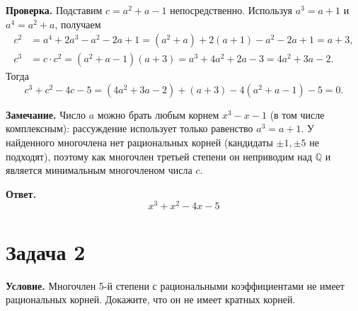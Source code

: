 \documentclass[12pt]{article}
\begin{document}
	\medskip
	\noindent
	\textbf{Проверка.} Подставим $c = a^2 + a - 1$ непосредственно. Используя $a^3 = a + 1$ и $a^4 = a^2 + a$, получаем
	\begin{align*}
		c^2 &= a^4 + 2a^3 - a^2 - 2a + 1 = (a^2 + a) + 2(a + 1) - a^2 - 2a + 1 = a + 3, \\
		c^3 &= c \cdot c^2 = (a^2 + a - 1)(a + 3) = a^3 + 4a^2 + 2a - 3 = 4a^2 + 3a - 2.
	\end{align*}
	Тогда
	\[
		c^3 + c^2 - 4c - 5 = (4a^2 + 3a - 2) + (a + 3) - 4(a^2 + a - 1) - 5 = 0.
	\]

	\medskip
	\noindent
	\textbf{Замечание.} Число $a$ можно брать любым корнем $x^3 - x - 1$ (в том числе комплексным): рассуждение использует только равенство $a^3 = a + 1$. У найденного многочлена нет рациональных корней (кандидаты $\pm 1, \pm 5$ не подходят), поэтому как многочлен третьей степени он неприводим над $\mathbb{Q}$ и является минимальным многочленом числа $c$.

	\medskip
	\noindent
	\textbf{Ответ.}
	\[
		\boxed{x^3 + x^2 - 4x - 5}
	\]

	\section*{Задача 2}

	\noindent
	\textbf{Условие.} Многочлен 5-й степени с рациональными коэффициентами не имеет рациональных корней. Докажите, что он не имеет кратных корней.
\end{document}

